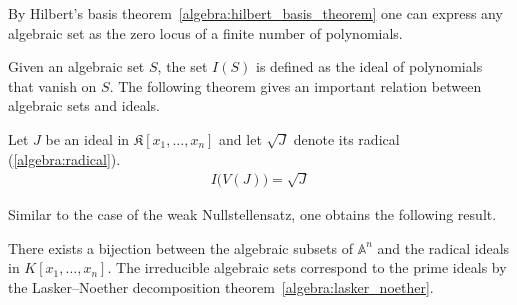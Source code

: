     \begin{property}
        By Hilbert's basis theorem~\ref{algebra:hilbert_basis_theorem} one can express any algebraic set as the zero locus of a finite number of polynomials.
    \end{property}

    Given an algebraic set $S$, the set $I(S)$ is defined as the ideal of polynomials that vanish on $S$. The following theorem gives an important relation between algebraic sets and ideals.
    \begin{theorem}
        Let $J$ be an ideal in $\mathfrak{K}[x_1,\ldots,x_n]$ and let $\sqrt{J}$ denote its radical (\cref{algebra:radical}).
        \begin{gather}
            I\bigl(V(J)\bigr) = \sqrt{J}
        \end{gather}
    \end{theorem}
    Similar to the case of the weak Nullstellensatz, one obtains the following result.
    \begin{result}
        There exists a bijection between the algebraic subsets of $\mathbb{A}^n$ and the radical ideals in $K[x_1,\ldots,x_n]$. The irreducible algebraic sets correspond to the prime ideals by the Lasker--Noether decomposition theorem~\ref{algebra:lasker_noether}.
    \end{result}


